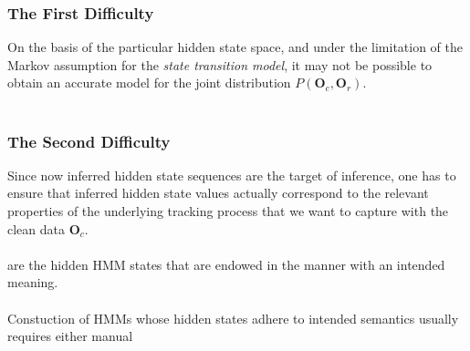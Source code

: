 
\begin{frame}
\frametitle{The First Difficulty}

On the basis of the particular hidden state space, and under the limitation of the Markov assumption for the \emph{state transition model}, it may not be possible to obtain an accurate model for the joint distribution $P(\mathbf{O}_c, \mathbf{O}_r)$.\\~\\

\begin{example}
\end{example}

\end{frame}


\begin{frame}
\frametitle{The Second Difficulty}

Since now inferred hidden state sequences are the target of inference, one has to ensure that inferred hidden state values actually correspond to the relevant properties of the underlying tracking process that we want to capture with the clean data $\mathbf{O}_c$.\\~\\

 are the hidden HMM states that are endowed in the manner with an intended meaning.\\~\\

Constuction of HMMs whose hidden states adhere to intended semantics usually requires either manual 

\end{frame}
